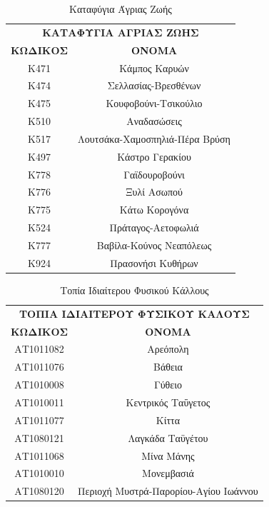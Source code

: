 \documentclass[12pt]{article}
\begin{document}
	\begin{table}[H]
		\centering
		\begin{tabular}{|c|c|}
			\hline
			\multicolumn{2}{|c|}{\textbf{ΚΑΤΑΦΥΓΙΑ ΑΓΡΙΑΣ ΖΩΗΣ}} \\
			\textbf{ΚΩΔΙΚΟΣ} & \textbf{ΟΝΟΜΑ} \\ \hline
			Κ471 & Κάμπος Καρυών \\ \hline
			Κ474 & Σελλασίας-Βρεσθένων \\ \hline
			Κ475 & Κουφοβούνι-Τσικούλιο \\ \hline
			Κ510 & Αναδασώσεις \\ \hline
			Κ517 & Λουτσάκα-Χαμοσπηλιά-Πέρα Βρύση \\ \hline
			Κ497 & Κάστρο Γερακίου \\ \hline
			Κ778 & Γαϊδουροβούνι \\ \hline
			Κ776 & Ξυλί Ασωπού \\ \hline
			Κ775 & Κάτω Κορογόνα \\ \hline
			Κ524 & Πράταγος-Αετοφωλιά \\ \hline
			Κ777 & Βαβίλα-Κούνος Νεαπόλεως \\ \hline
			Κ924 & Πρασονήσι Κυθήρων \\ \hline
		\end{tabular}
		\caption{Καταφύγια Άγριας Ζωής}
		\label{The label}
	\end{table}
	
	\begin{table}[H]
		\centering
		\begin{tabular}{|c|c|}
			\hline
			\multicolumn{2}{|c|}{\textbf{ΤΟΠΙΑ ΙΔΙΑΙΤΕΡΟΥ ΦΥΣΙΚΟΥ ΚΑΛΟΥΣ}} \\
			\textbf{ΚΩΔΙΚΟΣ} & \textbf{ΟΝΟΜΑ} \\ \hline
			ΑΤ1011082 & Αρεόπολη \\ \hline
			ΑΤ1011076 & Βάθεια \\ \hline
			ΑΤ1010008 & Γύθειο \\ \hline
			ΑΤ1010011 & Κεντρικός Ταΰγετος \\ \hline
			ΑΤ1011077 & Κίττα \\ \hline
			ΑΤ1080121 & Λαγκάδα Ταϋγέτου \\ \hline
			ΑΤ1011068 & Μίνα Μάνης \\ \hline
			ΑΤ1010010 & Μονεμβασιά \\ \hline
			ΑΤ1080120 & Περιοχή Μυστρά-Παρορίου-Αγίου Ιωάννου \\ \hline
		\end{tabular}
		\caption{Τοπία Ιδιαίτερου Φυσικού Κάλλους}
		\label{The label}
	\end{table}
	
\end{document}
